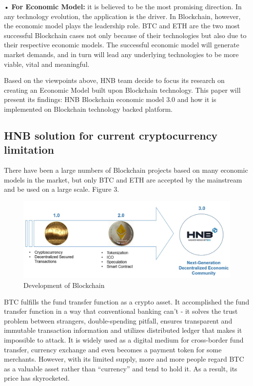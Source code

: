 \documentclass[fleqn,10pt]{SelfArx} %
\begin{document}
•	\textbf{For Economic Model: }it is believed to be the most promising direction. In any technology evolution, the application is the driver. In Blockchain, however, the economic model plays the leadership role. BTC and ETH are the two most successful Blockchain cases not only because of their technologies but also due to their respective economic models. The successful economic model will generate market demands, and in turn will lead any underlying technologies to be more viable, vital and meaningful.

Based on the viewpoints above, HNB team decide to focus its research on creating an Economic Model built upon Blockchain technology. This paper will present its findings: HNB Blockchain economic model 3.0 and how it is implemented on Blockchain technology backed platform.\\

\subsection{HNB solution for current cryptocurrency limitation}

There have been a large numbers of Blockchain projects based on many economic models in the market, but only BTC and ETH are accepted by the mainstream and be used on a large scale. Figure 3.\\

\begin{figure}[ht]\centering %
\includegraphics[width=\linewidth]{3}
\caption{Development of Blockchain}
\label{fig:3}
\end{figure}


BTC fulfills the fund transfer function as a crypto asset. It accomplished the fund transfer function in a way that conventional banking can’t - it solves the trust problem between strangers, double-spending pitfall, ensures transparent and immutable transaction information and utilizes distributed ledger that makes it impossible to attack. It is widely used as a digital medium for cross-border fund transfer, currency exchange and even becomes a payment token for some merchants. However, with its limited supply, more and more people regard BTC as a valuable asset rather than “currency” and tend to hold it. As a result, its price has skyrocketed. 
\end{document}
